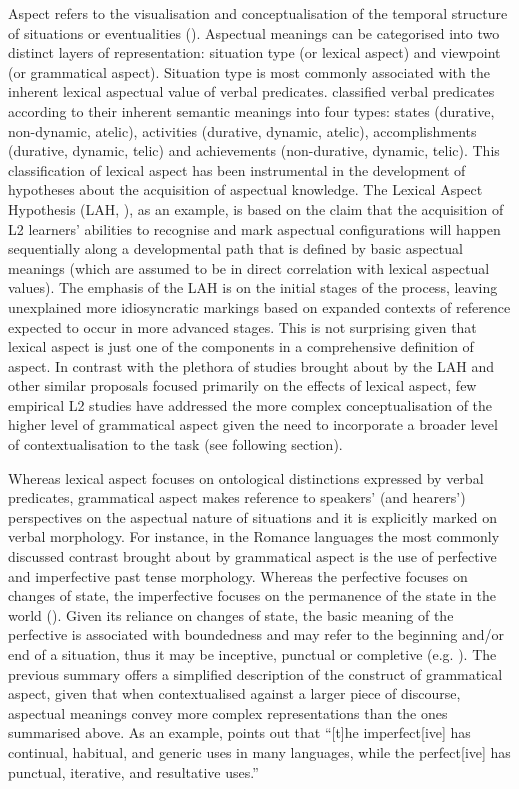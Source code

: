 \documentclass[output=paper,modfonts,nonflat,newtxmath]{langsci/langscibook}
\begin{document}
Aspect refers to the visualisation and conceptualisation of the temporal structure of situations or eventualities (\citealt{Comrie1976, Dahl1985, Smith1997}). Aspectual meanings can be categorised into two distinct layers of representation: situation type (or lexical aspect) and viewpoint (or grammatical aspect). Situation type is most commonly associated with the inherent lexical aspectual value of verbal predicates. \citet{Vendler1967} classified verbal predicates according to their inherent semantic meanings into four types: states (durative, non-dynamic, atelic), activities (durative, dynamic, atelic), accomplishments (durative, dynamic, telic) and achievements (non-durative, dynamic, telic). This classification of lexical aspect has been instrumental in the development of hypotheses about the acquisition of aspectual knowledge. The Lexical Aspect Hypothesis (LAH, \citealt{Andersen1991}), as an example, is based on the claim that the acquisition of L2 learners’ abilities to recognise and mark aspectual configurations will happen sequentially along a developmental path that is defined by basic aspectual meanings (which are assumed to be in direct correlation with lexical aspectual values). The emphasis of the LAH is on the initial stages of the process, leaving unexplained more idiosyncratic markings based on expanded contexts of reference expected to occur in more advanced stages. This is not surprising given that lexical aspect is just one of the components in a comprehensive definition of aspect. In contrast with the plethora of studies brought about by the LAH and other similar proposals focused primarily on the effects of lexical aspect, few empirical L2 studies have addressed the more complex conceptualisation of the higher level of grammatical aspect given the need to incorporate a broader level of contextualisation to the task (see following section).

Whereas lexical aspect focuses on ontological distinctions expressed by verbal predicates, grammatical aspect makes reference to speakers’ (and hearers’) perspectives on the aspectual nature of situations and it is explicitly marked on verbal morphology. For instance, in the Romance languages the most commonly discussed contrast brought about by grammatical aspect is the use of perfective and imperfective past tense morphology. Whereas the perfective focuses on changes of state, the imperfective focuses on the permanence of the state in the world (\citealt{Klein1994,CaudalRoussarie2005}). Given its reliance on changes of state, the basic meaning of the perfective is associated with boundedness and may refer to the beginning and/or end of a situation, thus it may be inceptive, punctual or completive (e.g. \citealt{Depraetre1995}). The previous summary offers a simplified description of the construct of grammatical aspect, given that when contextualised against a larger piece of discourse, aspectual meanings convey more complex representations than the ones summarised above. As an example, \citet[156]{Binnick1991} points out that “[t]he imperfect[ive] has continual, habitual, and generic uses in many languages, while the perfect[ive] has punctual, iterative, and resultative uses.”
\end{document}
